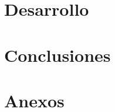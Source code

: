\documentclass[%
    a4paper,               %
    twoside,                %
    parskip=full,           %
    10pt,                   %
    titlepage=on,           %
    captions=tableabove,    %
]{article}                  %
\begin{document}
\section{Desarrollo}

\section{Conclusiones}



\clearpage

\appendix
\section{Anexos}
\end{document}
